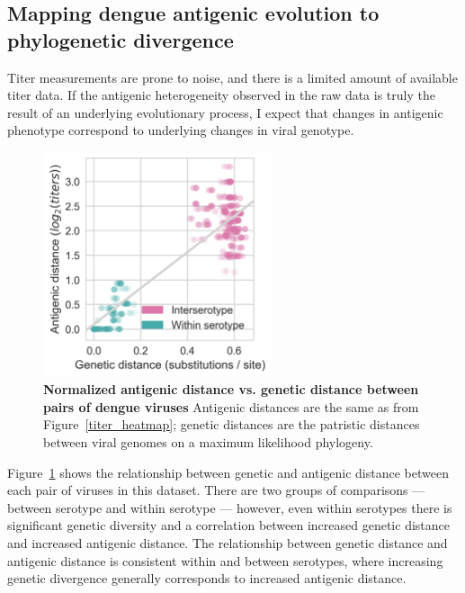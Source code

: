 \subsection{Mapping dengue antigenic evolution to phylogenetic divergence}
Titer measurements are prone to noise, and there is a limited amount of available titer data.
If the antigenic heterogeneity observed in the raw data is truly the result of an underlying evolutionary process, I expect that changes in antigenic phenotype correspond to underlying changes in viral genotype.
\begin{figure}[h!]
  \begin{centering}
  \includegraphics[width=0.6\textwidth]{./png/genetic_antigenic_distance.png}
  	\caption[Antigenic vs. genetic distance between pairs of dengue viruses]{\textbf{Normalized antigenic distance vs. genetic distance between pairs of dengue viruses }
    Antigenic distances are the same as from Figure~\ref{titer_heatmap};
    genetic distances are the patristic distances between viral genomes on a maximum likelihood phylogeny.
    }
  	\label{genetic_antigenic_distance}
  \end{centering}
\end{figure}

Figure~\ref{genetic_antigenic_distance} shows the relationship between genetic and antigenic distance between each pair of viruses in this dataset.
There are two groups of comparisons --- between serotype and within serotype --- however, even within serotypes there is significant genetic diversity and a correlation between increased genetic distance and increased antigenic distance.
The relationship between genetic distance and antigenic distance is consistent within and between serotypes, where increasing genetic divergence generally corresponds to increased antigenic distance.


